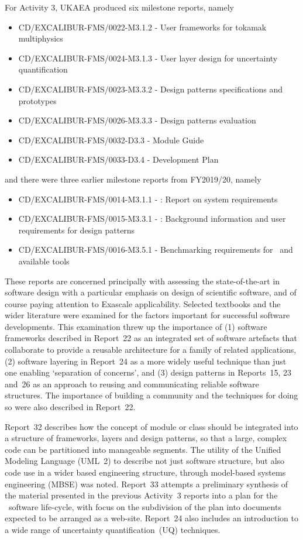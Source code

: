For Activity 3, UKAEA produced six milestone reports, namely
\begin{itemize}
\item CD/EXCALIBUR-FMS/0022-M3.1.2 - User frameworks for tokamak multiphysics 
\item CD/EXCALIBUR-FMS/0024-M3.1.3 - User layer design for uncertainty quantification
\item CD/EXCALIBUR-FMS/0023-M3.3.2 - Design patterns specifications and prototypes 
\item CD/EXCALIBUR-FMS/0026-M3.3.3 - Design patterns evaluation
\item CD/EXCALIBUR-FMS/0032-D3.3 - Module Guide
\item CD/EXCALIBUR-FMS/0033-D3.4 - Development Plan
\end{itemize}
and there were three earlier milestone reports from FY2019/20, namely
\begin{itemize}
\item CD/EXCALIBUR-FMS/0014-M3.1.1 - \nep: Report on system requirements
\item CD/EXCALIBUR-FMS/0015-M3.3.1 - \nep: Background information and user requirements for design patterns
\item CD/EXCALIBUR-FMS/0016-M3.5.1 - Benchmarking requirements for \nep\  and available tools
\end{itemize}

These reports are concerned principally with assessing the state-of-the-art in software
design with a particular emphasis on design of scientific software, and of course paying attention to
Exascale applicability. Selected textbooks and the wider literature were examined for the
factors important for successful software
developments. This examination threw up the importance of (1) software frameworks 
described in Report~22 as an integrated set of software artefacts that
collaborate to provide a reusable architecture for a family of related applications,
(2) software layering in Report~24 as a more widely useful  technique than just one enabling `separation of concerns',
and (3) design patterns in Reports~15, 23 and~26 as an approach to reusing and communicating
reliable software structures. 
The importance of building a community and the techniques for
doing so were also described in Report~22.

Report~32 describes how the concept of module or class
should be integrated into a structure of frameworks, layers and design patterns, so that
a large, complex code can be partitioned into manageable segments. The utility of 
the Unified Modeling Language (UML~2) to describe not just software structure,
but also code use in a wider based engineering structure, through
model-based systems engineering (MBSE) was noted.
Report~33 attempts a preliminary synthesis of the material
presented in the previous Activity~3 reports into a plan for the \nep\ software life-cycle,
with focus on the subdivision of the plan into documents expected to be arranged as a web-site.
Report~24 also includes an introduction
to a wide range of uncertainty quantification~(UQ) techniques.
